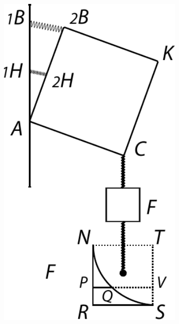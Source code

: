 \begin{minipage}[t][5.8cm][b]{0.33\textwidth}
\includegraphics[width=0.69\textwidth]{gesamttex/edit_VIII,3/images/dnr-3b_LH_37_03_071-072_d3b.pdf}
\end{minipage}
\hspace{3mm}
